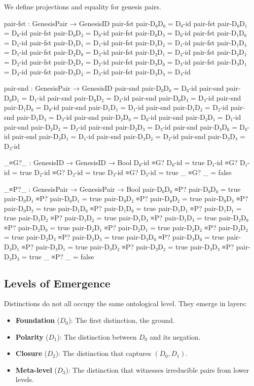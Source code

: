 \documentclass[11pt,a4paper]{book}
\begin{document}
We define projections and equality for genesis pairs.

\begin{code}
pair-fst : GenesisPair → GenesisID
pair-fst pair-D₀D₀ = D₀-id
pair-fst pair-D₀D₁ = D₀-id
pair-fst pair-D₀D₂ = D₀-id
pair-fst pair-D₀D₃ = D₀-id
pair-fst pair-D₁D₀ = D₁-id
pair-fst pair-D₁D₁ = D₁-id
pair-fst pair-D₁D₂ = D₁-id
pair-fst pair-D₁D₃ = D₁-id
pair-fst pair-D₂D₀ = D₂-id
pair-fst pair-D₂D₁ = D₂-id
pair-fst pair-D₂D₂ = D₂-id
pair-fst pair-D₂D₃ = D₂-id
pair-fst pair-D₃D₀ = D₃-id
pair-fst pair-D₃D₁ = D₃-id
pair-fst pair-D₃D₂ = D₃-id
pair-fst pair-D₃D₃ = D₃-id

pair-snd : GenesisPair → GenesisID
pair-snd pair-D₀D₀ = D₀-id
pair-snd pair-D₀D₁ = D₁-id
pair-snd pair-D₀D₂ = D₂-id
pair-snd pair-D₀D₃ = D₃-id
pair-snd pair-D₁D₀ = D₀-id
pair-snd pair-D₁D₁ = D₁-id
pair-snd pair-D₁D₂ = D₂-id
pair-snd pair-D₁D₃ = D₃-id
pair-snd pair-D₂D₀ = D₀-id
pair-snd pair-D₂D₁ = D₁-id
pair-snd pair-D₂D₂ = D₂-id
pair-snd pair-D₂D₃ = D₃-id
pair-snd pair-D₃D₀ = D₀-id
pair-snd pair-D₃D₁ = D₁-id
pair-snd pair-D₃D₂ = D₂-id
pair-snd pair-D₃D₃ = D₃-id

_≡G?_ : GenesisID → GenesisID → Bool
D₀-id ≡G? D₀-id = true
D₁-id ≡G? D₁-id = true
D₂-id ≡G? D₂-id = true
D₃-id ≡G? D₃-id = true
_     ≡G? _     = false

_≡P?_ : GenesisPair → GenesisPair → Bool
pair-D₀D₀ ≡P? pair-D₀D₀ = true
pair-D₀D₁ ≡P? pair-D₀D₁ = true
pair-D₀D₂ ≡P? pair-D₀D₂ = true
pair-D₀D₃ ≡P? pair-D₀D₃ = true
pair-D₁D₀ ≡P? pair-D₁D₀ = true
pair-D₁D₁ ≡P? pair-D₁D₁ = true
pair-D₁D₂ ≡P? pair-D₁D₂ = true
pair-D₁D₃ ≡P? pair-D₁D₃ = true
pair-D₂D₀ ≡P? pair-D₂D₀ = true
pair-D₂D₁ ≡P? pair-D₂D₁ = true
pair-D₂D₂ ≡P? pair-D₂D₂ = true
pair-D₂D₃ ≡P? pair-D₂D₃ = true
pair-D₃D₀ ≡P? pair-D₃D₀ = true
pair-D₃D₁ ≡P? pair-D₃D₁ = true
pair-D₃D₂ ≡P? pair-D₃D₂ = true
pair-D₃D₃ ≡P? pair-D₃D₃ = true
_         ≡P? _         = false

\end{code}

\subsection{Levels of Emergence}

Distinctions do not all occupy the same ontological level. They emerge in layers:
\begin{itemize}
\item \textbf{Foundation} ($D_0$): The first distinction, the ground.
\item \textbf{Polarity} ($D_1$): The distinction between $D_0$ and its negation.
\item \textbf{Closure} ($D_2$): The distinction that captures $(D_0, D_1)$.
\item \textbf{Meta-level} ($D_3$): The distinction that witnesses irreducible pairs from lower levels.
\end{itemize}
\end{document}
